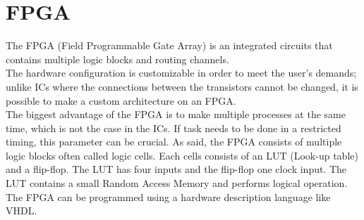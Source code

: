 \section{FPGA}


The FPGA (Field Programmable Gate Array) is an integrated circuits that contains multiple logic blocks and routing channels. \\
The hardware configuration is customizable in order to meet the user’s demands; unlike ICs where the connections between the transistors cannot be changed, it is possible to make a custom architecture on an FPGA. \\
The biggest advantage of the FPGA is to make multiple processes at the same time, which is not the case in the ICs. If task needs to be done in a restricted timing, this parameter can be crucial. 
As said, the FPGA consists of multiple logic blocks often called logic cells. Each cells consists of an LUT (Look-up table) and a flip-flop. The LUT has four inputs and the flip-flop one clock input. The LUT contains a small Random Access Memory and performs logical operation. \\


The FPGA can be programmed using a hardware description language like VHDL. \\





\begin{comment}
FPGA are rather preferred over DSPs for digital signal processing when a high sample rate is needed. A normal DSP is designed to perform a specific task but can have limitations in the number of tasks that can be done per second. In today’s world, demands are increasing faster than the development of DSPs which means in many cases a single DSP is no longer efficient. One solution is to use multiple DSPs but architecture is more complex and an implementation of this type is not cost efficient. Using multiple devices forces the programmer to code some scheduling algorithms in order to achieve what is wanted which adds more overhead on the machine. 
In order to further understand why an FPGA is more efficient than the traditional DSP, the two modules need to be further explained.
\end{comment}
